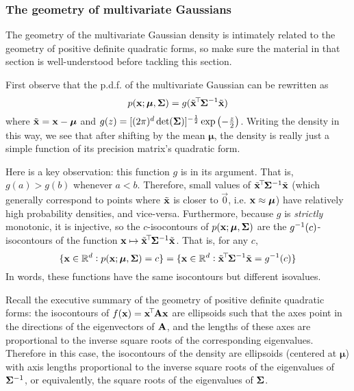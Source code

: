 \subsubsection{The geometry of multivariate Gaussians}
The geometry of the multivariate Gaussian density is intimately related to the geometry of positive definite quadratic forms, so make sure the material in that section is well-understood before tackling this section.

First observe that the p.d.f. of the multivariate Gaussian can be rewritten as
\[p(\mathbf{x}; \bm\mu, \mathbf{\Sigma}) = g(\tilde{\mathbf{x}}^{\!\top\!}\mathbf{\Sigma}^{-1}\tilde{\mathbf{x}})\]
where $\tilde{\mathbf{x}} = \mathbf{x} - \bm\mu$ and $g(z) = [(2\pi)^d \det(\mathbf{\Sigma})]^{-\frac{1}{2}}\exp\left(-\frac{z}{2}\right)$.
Writing the density in this way, we see that after shifting by the mean $\bm\mu$, the density is really just a simple function of its precision matrix's quadratic form.

Here is a key observation: this function $g$ is  in its argument.
That is, $g(a) > g(b)$ whenever $a < b$.
Therefore, small values of $\tilde{\mathbf{x}}^{\!\top\!}\mathbf{\Sigma}^{-1}\tilde{\mathbf{x}}$ (which generally correspond to points where $\tilde{\mathbf{x}}$ is closer to $\vec{0}$, i.e. $\mathbf{x} \approx \bm\mu$) have relatively high probability densities, and vice-versa.
Furthermore, because $g$ is \textit{strictly} monotonic, it is injective, so the $c$-isocontours of $p(\mathbf{x}; \bm\mu, \mathbf{\Sigma})$ are the $g^{-1}(c)$-isocontours of the function $\mathbf{x} \mapsto \tilde{\mathbf{x}}^{\!\top\!}\mathbf{\Sigma}^{-1}\tilde{\mathbf{x}}$.
That is, for any $c$,
\[\{\mathbf{x} \in \mathbb{R}^d : p(\mathbf{x}; \bm\mu, \mathbf{\Sigma}) = c\} = \{\mathbf{x} \in \mathbb{R}^d : \tilde{\mathbf{x}}^{\!\top\!}\mathbf{\Sigma}^{-1}\tilde{\mathbf{x}} = g^{-1}(c)\}\]
In words, these functions have the same isocontours but different isovalues.

Recall the executive summary of the geometry of positive definite quadratic forms: the isocontours of $f(\mathbf{x}) = \mathbf{x}^{\!\top\!}\mathbf{A}\mathbf{x}$ are ellipsoids such that the axes point in the directions of the eigenvectors of $\mathbf{A}$, and the lengths of these axes are proportional to the inverse square roots of the corresponding eigenvalues.
Therefore in this case, the isocontours of the density are ellipsoids (centered at $\bm\mu$) with axis lengths proportional to the inverse square roots of the eigenvalues of $\mathbf{\Sigma}^{-1}$, or equivalently, the square roots of the eigenvalues of $\mathbf{\Sigma}$.
